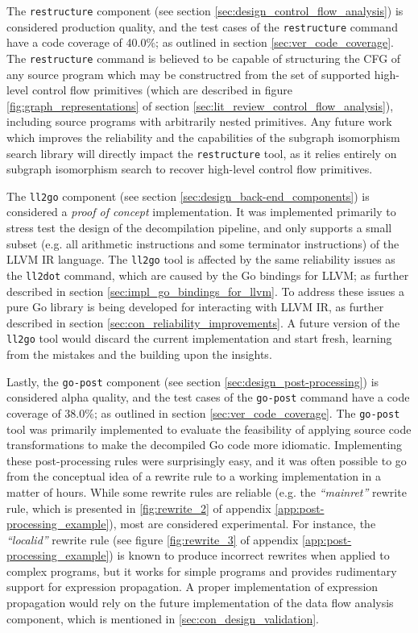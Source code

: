 The \texttt{restructure} component (see section \ref{sec:design_control_flow_analysis}) is considered production quality, and the test cases of the \texttt{restructure} command have a code coverage of 40.0\%; as outlined in section \ref{sec:ver_code_coverage}. The \texttt{restructure} command is believed to be capable of structuring the CFG of any source program which may be constructred from the set of supported high-level control flow primitives (which are described in figure \ref{fig:graph_representations} of section \ref{sec:lit_review_control_flow_analysis}), including source programs with arbitrarily nested primitives. Any future work which improves the reliability and the capabilities of the subgraph isomorphism search library will directly impact the \texttt{restructure} tool, as it relies entirely on subgraph isomorphism search to recover high-level control flow primitives.

The \texttt{ll2go} component (see section \ref{sec:design_back-end_components}) is considered a \textit{proof of concept} implementation. It was implemented primarily to stress test the design of the decompilation pipeline, and only supports a small subset (e.g. all arithmetic instructions and some terminator instructions) of the LLVM IR language. The \texttt{ll2go} tool is affected by the same reliability issues as the \texttt{ll2dot} command, which are caused by the Go bindings for LLVM; as further described in section \ref{sec:impl_go_bindings_for_llvm}. To address these issues a pure Go library is being developed for interacting with LLVM IR, as further described in section \ref{sec:con_reliability_improvements}. A future version of the \texttt{ll2go} tool would discard the current implementation and start fresh, learning from the mistakes and the building upon the insights.

Lastly, the \texttt{go-post} component (see section \ref{sec:design_post-processing}) is considered alpha quality, and the test cases of the \texttt{go-post} command have a code coverage of 38.0\%; as outlined in section \ref{sec:ver_code_coverage}. The \texttt{go-post} tool was primarily implemented to evaluate the feasibility of applying source code transformations to make the decompiled Go code more idiomatic. Implementing these post-processing rules were surprisingly easy, and it was often possible to go from the conceptual idea of a rewrite rule to a working implementation in a matter of hours. While some rewrite rules are reliable (e.g. the \textit{``mainret''} rewrite rule, which is presented in \ref{fig:rewrite_2} of appendix \ref{app:post-processing_example}), most are considered experimental. For instance, the \textit{``localid''} rewrite rule (see figure \ref{fig:rewrite_3} of appendix \ref{app:post-processing_example}) is known to produce incorrect rewrites when applied to complex programs, but it works for simple programs and provides rudimentary support for expression propagation. A proper implementation of expression propagation would rely on the future implementation of the data flow analysis component, which is mentioned in \ref{sec:con_design_validation}.






